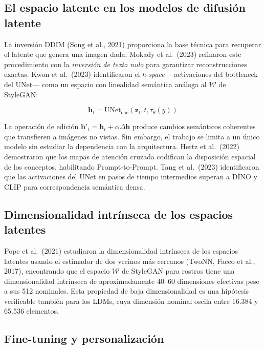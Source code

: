 \documentclass[12pt, a4paper, twoside]{book}
\newcommand{\z}{\mathbf{z}}
\begin{document}
\subsection{El espacio latente en los modelos de difusión latente}

La inversión DDIM (Song et al., 2021) proporciona la base técnica para recuperar el latente que genera una imagen dada; Mokady et al.\ (2023) refinaron este procedimiento con la \textit{inversión de texto nulo} para garantizar reconstrucciones exactas. Kwon et al.\ (2023) identificaron el \textit{h-space} ---activaciones del bottleneck del UNet--- como un espacio con linealidad semántica análoga al $\mathcal{W}$ de StyleGAN:

\begin{equation}
\mathbf{h}_t = \text{UNet}_\text{enc}(\z_t, t, \tau_\theta(y))
\end{equation}

La operación de edición $\mathbf{h}'_t = \mathbf{h}_t + \alpha\Delta\mathbf{h}$ produce cambios semánticos coherentes que transfieren a imágenes no vistas. Sin embargo, el trabajo se limita a un único modelo sin estudiar la dependencia con la arquitectura. Hertz et al.\ (2022) demostraron que los mapas de atención cruzada codifican la disposición espacial de los conceptos, habilitando Prompt-to-Prompt. Tang et al.\ (2023) identificaron que las activaciones del UNet en pasos de tiempo intermedios superan a DINO y CLIP para correspondencia semántica densa.

\subsection{Dimensionalidad intrínseca de los espacios latentes}

Pope et al.\ (2021) estudiaron la dimensionalidad intrínseca de los espacios latentes usando el estimador de dos vecinos más cercanos (TwoNN, Facco et al., 2017), encontrando que el espacio $\mathcal{W}$ de StyleGAN para rostros tiene una dimensionalidad intrínseca de aproximadamente 40--60 dimensiones efectivas pese a sus 512 nominales. Esta propiedad de baja dimensionalidad es una hipótesis verificable también para los LDMs, cuya dimensión nominal oscila entre 16.384 y 65.536 elementos.

\subsection{Fine-tuning y personalización}
\end{document}
